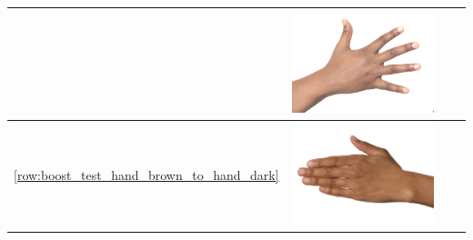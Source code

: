 \begin{longtable}{|c||c|c|c|}
\begin{minipage}{.29\textwidth}
  \end{minipage} & 
  \begin{minipage}{.29\textwidth}
    \includegraphics[width=\textwidth,height=\textheight,keepaspectratio]{../rc_test/outputs/20170516_boost_test/hand_dark_to_hand_light.jpg}
  \end{minipage} \\
    \hline  \ref{row:boost_test_hand_brown_to_hand_dark} &
  \begin{minipage}{.29\textwidth}
    \includegraphics[width=\textwidth,height=\textheight,keepaspectratio]{../inputs/hand_brown.jpg}
  \end{minipage} & 
  \begin{minipage}{.29\textwidth}

\end{minipage}
\end{longtable}
